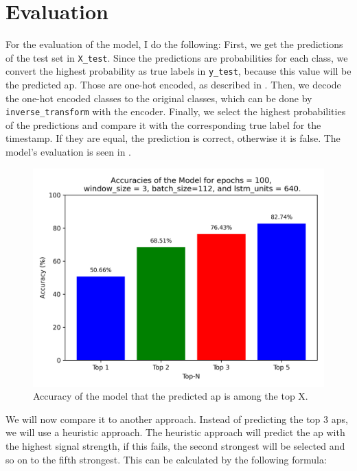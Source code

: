 \chapter{Evaluation}\label{ch:evaluation}

For the evaluation of the model, I do the following:
First, we get the predictions of the test set in \texttt{X\_test}.
Since the predictions are probabilities for each class, we convert the highest probability as true labels in \texttt{y\_test}, because this value will be the predicted \ac{ap}.
Those are one-hot encoded, as described in .
Then, we decode the one-hot encoded classes to the original classes, which can be done by \texttt{inverse\_transform} with the encoder.
Finally, we select the highest probabilities of the predictions and compare it with the corresponding true label for the timestamp.
If they are equal, the prediction is correct, otherwise it is false.
The model's evaluation is seen in .

\begin{figure}[h]
    \includegraphics*[scale=0.8]{images/accuracy_epochs_100_window_3_batch_112_lstm_640.png}
    \caption{Accuracy of the model that the predicted \ac{ap} is among the top X.}
    \label{fig:accuracy_epochs_100_window_3_batch_112_lstm_640}
\end{figure}

We will now compare it to another approach.
Instead of predicting the top 3 \acp{ap}, we will use a heuristic approach.
The heuristic approach will predict the \ac{ap} with the highest signal strength, if this fails, the second strongest will be selected and so on to the fifth strongest.
This can be calculated by the following formula:
